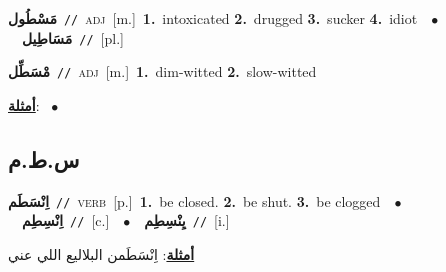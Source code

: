 \documentclass[10pt,a4paper,twoside]{article} %
\begin{document}
\begin{multicols}{2}
{\setlength\topsep{0pt}\textbf{\foreignlanguage{arabic}{مَسْطُول}}\ {\color{gray}\texttt{//}\color{black}}\ \textsc{adj}\ [m.]\ \textbf{1.}~intoxicated  \textbf{2.}~drugged  \textbf{3.}~sucker  \textbf{4.}~idiot\ \ $\bullet$\ \ \setlength\topsep{0pt}\textbf{\foreignlanguage{arabic}{مَسَاطِيل}}\ {\color{gray}\texttt{//}\color{black}}\ [pl.]\ } \vspace{2mm}

{\setlength\topsep{0pt}\textbf{\foreignlanguage{arabic}{مْسَطِّل}}\ {\color{gray}\texttt{//}\color{black}}\ \textsc{adj}\ [m.]\ \textbf{1.}~dim-witted  \textbf{2.}~slow-witted\  \begin{flushright}\color{gray}\foreignlanguage{arabic}{\textbf{\underline{\foreignlanguage{arabic}{أمثلة}}}: \ $\bullet$\ \  }\end{flushright}\color{black}} \vspace{2mm}

\vspace{-3mm}
\subsection*{\color{blue}\foreignlanguage{arabic}{س.ط.م}\color{blue}{}} 

{\setlength\topsep{0pt}\textbf{\foreignlanguage{arabic}{اِنْسَطَم}}\ {\color{gray}\texttt{//}\color{black}}\ \textsc{verb}\ [p.]\ \textbf{1.}~be closed.  \textbf{2.}~be shut.  \textbf{3.}~be clogged\ \ $\bullet$\ \ \setlength\topsep{0pt}\textbf{\foreignlanguage{arabic}{اِنْسِطِم}}\ {\color{gray}\texttt{//}\color{black}}\ [c.]\ \ $\bullet$\ \ \setlength\topsep{0pt}\textbf{\foreignlanguage{arabic}{يِنْسِطِم}}\ {\color{gray}\texttt{//}\color{black}}\ [i.]\  \begin{flushright}\color{gray}\foreignlanguage{arabic}{\textbf{\underline{\foreignlanguage{arabic}{أمثلة}}}: اِنْسَطَمن البلاليع اللي عني}\end{flushright}\color{black}} \vspace{2mm}


\end{multicols}
\end{document}
